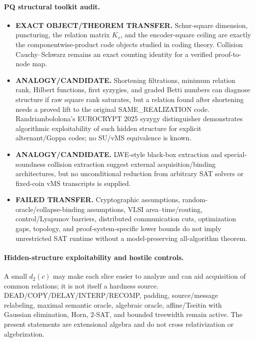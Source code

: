 \documentclass[11pt]{article}
\begin{document}
\paragraph{PQ structural toolkit audit.}
\begin{itemize}
\item[] \textbf{EXACT OBJECT/THEOREM TRANSFER.} Schur-square dimension, puncturing, the relation matrix \(K_v\), and the encoder-square ceiling are exactly the componentwise-product code objects studied in coding theory. Collision Cauchy--Schwarz remains an exact counting identity for a verified proof-to-node map.
\item[] \textbf{ANALOGY/CANDIDATE.} Shortening filtrations, minimum relation rank, Hilbert functions, first syzygies, and graded Betti numbers can diagnose structure if raw square rank saturates, but a relation found after shortening needs a proved lift to the original SAME\_REALIZATION code. Randriambololona's EUROCRYPT 2025 syzygy distinguisher demonstrates algorithmic exploitability of such hidden structure for explicit alternant/Goppa codes; no SU/vMS equivalence is known.
\item[] \textbf{ANALOGY/CANDIDATE.} LWE-style black-box extraction and special-soundness collision extraction suggest external acquisition/binding architectures, but no unconditional reduction from arbitrary SAT solvers or fixed-coin vMS transcripts is supplied.
\item[] \textbf{FAILED TRANSFER.} Cryptographic assumptions, random-oracle/collapse-binding assumptions, VLSI area--time/routing, control/Lyapunov barriers, distributed communication cuts, optimization gaps, topology, and proof-system-specific lower bounds do not imply unrestricted SAT runtime without a model-preserving all-algorithm theorem.
\end{itemize}

\paragraph{Hidden-structure exploitability and hostile controls.}
A small \(d_2(c)\) may make each slice easier to analyze and can aid acquisition of common relations; it is not itself a hardness source. DEAD/COPY/DELAY/INTERP/RECOMP, padding, source/message relabeling, maximal semantic oracle, algebraic oracle, affine/Tseitin with Gaussian elimination, Horn, 2-SAT, and bounded treewidth remain active. The present statements are extensional algebra and do not cross relativization or algebrization.
\end{document}
